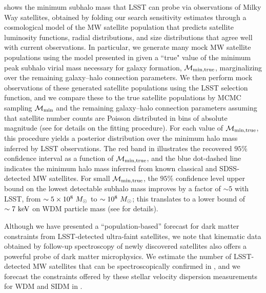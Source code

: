 shows the minimum subhalo mass that LSST can probe via observations of Milky Way satellites, obtained by folding our search sensitivity estimates through a cosmological model of the MW satellite population that predicts satellite luminosity functions, radial distributions, and size distributions that agree well with current observations. In particular, we generate many mock MW satellite populations using the model presented in \cite{Nadler:2018} given a ``true" value of the minimum peak subhalo virial mass necessary for galaxy formation, $\mathcal{M}_{\rm{min,true}}$, marginalizing over the remaining galaxy--halo connection parameters. We then perform mock observations of these generated satellite populations using the LSST selection function, and we compare these to the true satellite populations by MCMC sampling $\mathcal{M}_{\rm{min}}$ and the remaining galaxy--halo connection parameters assuming that satellite number counts are Poisson distributed in bins of absolute magnitude (see \citealt{Nadler:2018} for details on the fitting procedure). For each value of $\mathcal{M}_{\rm{min,true}}$, this procedure yields a posterior distribution over the minimum halo mass inferred by LSST observations. The red band in  illustrates the recovered $95\%$ confidence interval as a function of $\mathcal{M}_{\rm{min,true}}$, and the blue dot-dashed line indicates the minimum halo mass inferred from known classical and SDSS-detected MW satellites. 
For small $\mathcal{M}_{\rm{min,true}}$, the $95\%$ confidence level upper bound on the lowest detectable subhalo mass improves by a factor of $\sim 5$ with LSST, from $\sim 5 \times 10^{8}\ \Msun$ to $\sim 10^{8}\ M_\odot$; this translates to a lower bound of $\sim 7\ \rm{keV}$ on WDM particle mass (see  for details).

Although we have presented a ``population-based'' forecast for dark matter constraints from LSST-detected ultra-faint satellites, we note that kinematic data obtained by follow-up spectroscopy of newly discovered satellites also offers a powerful probe of dark matter microphysics. We estimate the number of LSST-detected MW satellites that can be spectroscopically confirmed in , and we forecast the constraints offered by these stellar velocity dispersion measurements for WDM and SIDM in .

